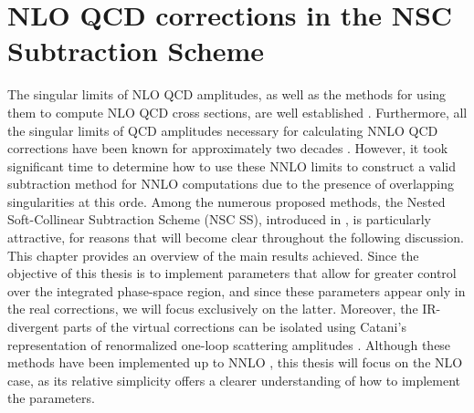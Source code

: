 \documentclass[a4paper, 12pt]{book}
\begin{document}
\chapter{NLO QCD corrections in the NSC Subtraction Scheme}
\label{NSC-SS}
The singular limits of NLO QCD amplitudes, as well as the methods for using them to compute NLO QCD cross sections, are well established \cite{Frixione:1995ms,Catani:1996vz}. Furthermore, all the singular limits of QCD amplitudes necessary for calculating NNLO QCD corrections have been known for approximately two decades \cite{Catani:1996vz}. However, it took significant time to determine how to use these NNLO limits to construct a valid subtraction method for NNLO computations due to the presence of overlapping singularities at this orde. Among the numerous proposed methods, the Nested Soft-Collinear Subtraction Scheme (NSC SS), introduced in \cite{Caola:2017dug}, is particularly attractive, for reasons that will become clear throughout the following discussion. \\
This chapter provides an overview of the main results achieved. Since the objective of this thesis is to implement parameters that allow for greater control over the integrated phase-space region, and since these parameters appear only in the real corrections, we will focus exclusively on the latter. Moreover, the IR-divergent parts of the virtual corrections can be isolated using Catani's representation of renormalized one-loop scattering amplitudes \cite{Catani:1998bh}. Although these methods have been implemented up to NNLO \cite{Caola:1902, Caola:1907, Asteriadis:1910, Devoto:2023rpv, Devoto:2025kin}, this thesis will focus on the NLO case, as its relative simplicity offers a clearer understanding of how to implement the parameters.
\end{document}
